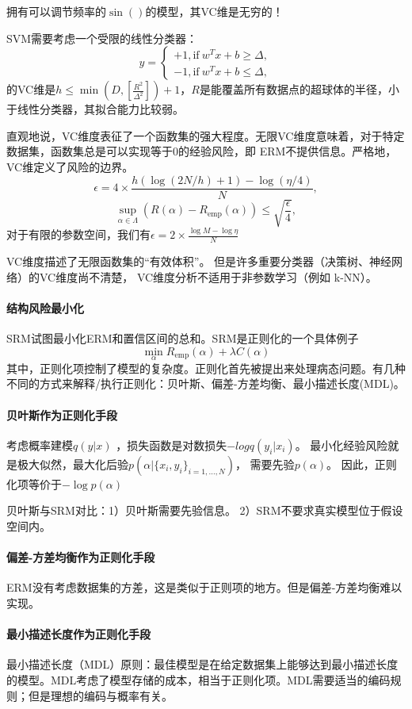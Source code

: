 拥有可以调节频率的$\sin()$的模型，其VC维是无穷的！

SVM需要考虑一个受限的线性分类器：$$y=\left\{\begin{aligned} 
+1, \text{if}\ w^Tx+b\ge \Delta, \\
-1, \text{if}\ w^Tx+b\le \Delta,
\end{aligned}\right.$$的VC维是$h \le \min(D, [\frac{R^2}{\Delta^2}]) + 1$，$R$是能覆盖所有数据点的超球体的半径，小于线性分类器，其拟合能力比较弱。

直观地说，VC维度表征了一个函数集的强大程度。无限VC维度意味着，对于特定数据集，函数集总是可以实现等于0的经验风险，即 ERM不提供信息。严格地，VC维定义了风险的边界。
$$
\epsilon = 4\times \frac{h(\log(2N/h)+1) - \log(\eta/4)}{N},
$$
$$
\sup_{\alpha \in \Lambda}(R(\alpha) - R_\text{emp}(\alpha)) \le \sqrt{\frac{\epsilon}{4}},
$$
对于有限的参数空间，我们有$\epsilon = 2 \times \frac{\log M - \log \eta}{N}$

VC维度描述了无限函数集的“有效体积”。
但是许多重要分类器（决策树、神经网络）的VC维度尚不清楚，
VC维度分析不适用于非参数学习（例如 k-NN）。

\paragraph{结构风险最小化}
SRM试图最小化ERM和置信区间的总和。SRM是正则化的一个具体例子
$$\min_\alpha R_\text{emp}(\alpha) + \lambda C(\alpha)$$
其中，正则化项控制了模型的复杂度。正则化首先被提出来处理病态问题。有几种不同的方式来解释/执行正则化：贝叶斯、偏差-方差均衡、最小描述长度(MDL)。

\paragraph{贝叶斯作为正则化手段}
考虑概率建模$q(y|x)$
，损失函数是对数损失$-log q(y_i|x_i)$。
最小化经验风险就是极大似然，最大化后验$p(\alpha | \{x_i, y_i\}_{i = 1,\ldots, N})$，
需要先验$p(\alpha)$。
因此，正则化项等价于$-\log p(\alpha)$

贝叶斯与SRM对比：1）贝叶斯需要先验信息。
2）SRM不要求真实模型位于假设空间内。

\paragraph{偏差-方差均衡作为正则化手段} ERM没有考虑数据集的方差，这是类似于正则项的地方。但是偏差-方差均衡难以实现。

\paragraph{最小描述长度作为正则化手段} 最小描述长度（MDL）原则：最佳模型是在给定数据集上能够达到最小描述长度的模型。MDL考虑了模型存储的成本，相当于正则化项。MDL需要适当的编码规则；但是理想的编码与概率有关。

